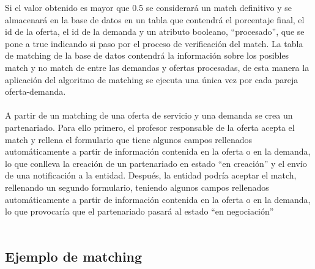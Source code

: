 \documentclass[11pt]{article}
\begin{document}
 Si el valor obtenido es mayor que 0.5 se considerará un match definitivo y se almacenará en la base de datos en un tabla que contendrá el porcentaje final, el id de la oferta, el id de la demanda y un atributo booleano, “procesado”, que se pone a true indicando si paso por el proceso de verificación del match. La tabla de matching de la base de datos contendrá la información sobre los posibles match y no match de entre las demandas y ofertas procesadas, de esta manera la aplicación del algoritmo de matching se ejecuta una única vez por cada pareja oferta-demanda. \\\\
 
 A partir de un matching de una oferta de servicio y una demanda se crea un partenariado. Para ello primero, el profesor responsable de la oferta acepta el match y rellena el formulario que tiene  algunos campos rellenados automáticamente a partir de información contenida en la oferta o en la demanda, lo que conlleva la creación de un partenariado en estado “en creación” y el envío de una notificación a la entidad. Después, la entidad podría aceptar el match, rellenando un segundo formulario, teniendo algunos campos rellenados automáticamente a partir de información contenida en la oferta o en la demanda, lo que provocaría que el partenariado pasará al estado “en negociación” \\\\
 
  \subsection{Ejemplo de matching}
  
\end{document}
